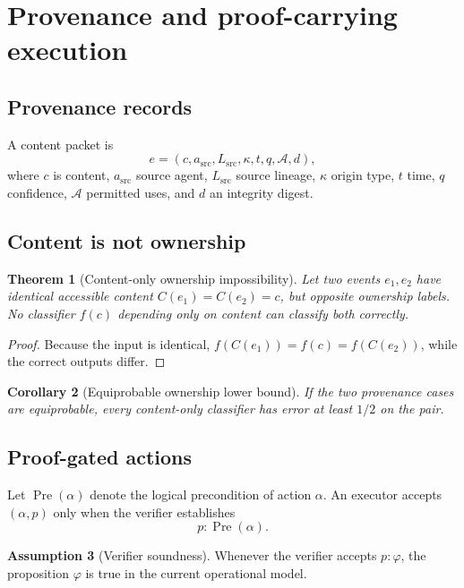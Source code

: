 \documentclass[11pt]{article}
\newtheorem{theorem}{Theorem}[section]
\newtheorem{corollary}[theorem]{Corollary}
\theoremstyle{definition}
\newtheorem{assumption}[theorem]{Assumption}
\theoremstyle{remark}
\begin{document}
\section{Provenance and proof-carrying execution}

\subsection{Provenance records}

A content packet is
\[
e=(c,a_{\mathrm{src}},L_{\mathrm{src}},\kappa,t,q,\mathcal A,d),
\]
where \(c\) is content, \(a_{\mathrm{src}}\) source agent, \(L_{\mathrm{src}}\) source lineage, \(\kappa\) origin type, \(t\) time, \(q\) confidence, \(\mathcal A\) permitted uses, and \(d\) an integrity digest.

\subsection{Content is not ownership}

\begin{theorem}[Content-only ownership impossibility]
Let two events \(e_1,e_2\) have identical accessible content \(C(e_1)=C(e_2)=c\), but opposite ownership labels. No classifier \(f(c)\) depending only on content can classify both correctly.
\end{theorem}

\begin{proof}
Because the input is identical, \(f(C(e_1))=f(c)=f(C(e_2))\), while the correct outputs differ.
\end{proof}

\begin{corollary}[Equiprobable ownership lower bound]
If the two provenance cases are equiprobable, every content-only classifier has error at least \(1/2\) on the pair.
\end{corollary}

\subsection{Proof-gated actions}

Let \(\operatorname{Pre}(\alpha)\) denote the logical precondition of action \(\alpha\). An executor accepts \((\alpha,p)\) only when the verifier establishes
\[
p:\operatorname{Pre}(\alpha).
\]

\begin{assumption}[Verifier soundness]
Whenever the verifier accepts \(p:\varphi\), the proposition \(\varphi\) is true in the current operational model.
\end{assumption}
\end{document}
